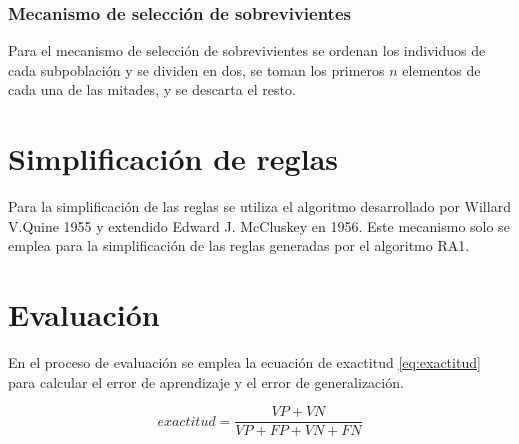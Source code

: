 \subsubsection{Mecanismo de selección de sobrevivientes}

Para el mecanismo de selección de sobrevivientes se ordenan los individuos de cada subpoblación y se dividen en dos, se toman los primeros $n$ elementos de cada una de las mitades, y se descarta el resto.

\section{Simplificación de reglas}

Para la simplificación de las reglas se utiliza el algoritmo desarrollado por Willard V.Quine 1955 y extendido Edward J. McCluskey  en 1956. Este mecanismo solo se emplea para la simplificación de las reglas generadas por el algoritmo RA1.


\section{Evaluación}

En el proceso de evaluación se emplea la  ecuación de exactitud \ref{eq:exactitud} para calcular el error de aprendizaje y el error de generalización.


\[
exactitud = \frac{VP + VN}{VP+FP+VN+FN} \label{eq:exactitud} 
\]